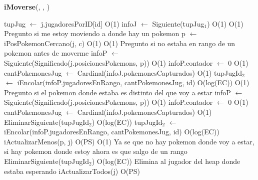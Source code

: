 \begin{algorithm}[H]{\textbf{iMoverse}(, , )}{}
	\begin{algorithmic}
	\State tupJug $\gets$ j.jugadoresPorID[id]	\Comment O(1)
	\State infoJ $\gets$ Siguiente(tupJug$_{1}$)	\Comment O(1)
		\Comment O(1) {Pregunto si me estoy moviendo a donde hay un pokemon}
		\State p $\gets$ iPosPokemonCercano(j, c)	\Comment O(1)
			\Comment O(1) {Pregunto si no estaba en rango de un pokemon antes de moverme}
			\State infoP $\gets$ Siguiente(Significado(j.posicionesPokemons, p))	\Comment O(1)
			\State infoP.contador $\gets$ 0 \Comment O(1)
			\State cantPokemonesJug $\gets$ Cardinal(infoJ.pokemonesCapturados)	\Comment O(1)
			\State tupJugId$_{2}$ $\gets$ iEncolar(infoP.jugadoresEnRango, cantPokemonesJug, id)	\Comment O(log(EC))
		\Else
				\Comment O(1) {Pregunto si el pokemon donde estaba es distinto del que voy a estar}
				\State infoP $\gets$ Siguiente(Significado(j.posicionesPokemons, p))	\Comment O(1)
			\State infoP.contador $\gets$ 0 \Comment O(1)
			\State cantPokemonesJug $\gets$ Cardinal(infoJ.pokemonesCapturados)	\Comment O(1)
			\State EliminarSiguiente(tupJugId$_{2}$)	\Comment O(log(EC))
			\State tupJugId$_{2}$ $\gets$ iEncolar(infoP.jugadoresEnRango, cantPokemonesJug, id)	\Comment O(log(EC))
			\EndIf
		\EndIf
		\State iActualizarMenos(p, j)	\Comment O(PS)
	\Else
			\Comment O(1) {Ya se que no hay pokemon donde voy a estar, si hay pokemon donde estoy ahora es que salgo de un rango}
			\State EliminarSiguiente(tupJugId$_{2}$)	\Comment O(log(EC)) {Elimina al jugador del heap donde estaba esperando}
		\EndIf
		\State iActualizarTodos(j)	\Comment O(PS)


\end{algorithmic}
\end{algorithm}
